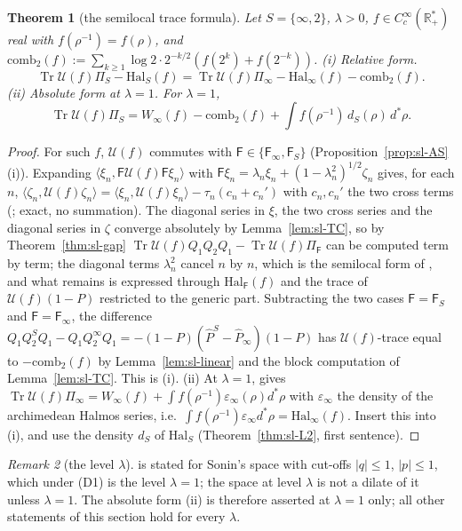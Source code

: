 \documentclass[11pt]{amsart}
\newtheorem{theorem}{Theorem}[section]
\theoremstyle{definition}
\theoremstyle{remark}
\newtheorem{remark}[theorem]{Remark}
\newcommand{\R}{\mathbb R}
\begin{document}
\begin{theorem}[the semilocal trace formula]\label{thm:sl-84}
Let $S=\{\infty,2\}$, $\lambda>0$, $f\in C_c^\infty(\R_+^*)$ real with $f(\rho^{-1})=f(\rho)$, and
$\mathrm{comb}_2(f):=\sum_{k\ge1}\log2\cdot2^{-k/2}(f(2^k)+f(2^{-k}))$.
\emph{(i) Relative form.}
\[
\operatorname{Tr}\mathcal U(f)\Pi_S-\mathrm{Hal}_S(f)=\operatorname{Tr}\mathcal U(f)\Pi_\infty-\mathrm{Hal}_\infty(f)-\mathrm{comb}_2(f).
\]
\emph{(ii) Absolute form at $\lambda=1$.} For $\lambda=1$,
\[
\operatorname{Tr}\mathcal U(f)\Pi_S=W_\infty(f)-\mathrm{comb}_2(f)+\int f(\rho^{-1})\,d_S(\rho)\,d^*\rho .
\]
\end{theorem}
\begin{proof}
For such $f$, $\mathcal U(f)$ commutes with $\mathsf F\in\{\mathsf F_\infty,\mathsf F_S\}$ (Proposition~\ref{prop:sl-AS}(i)). Expanding
$\langle\xi_n,\mathsf F\mathcal U(f)\mathsf F\xi_n\rangle$ with $\mathsf F\xi_n=\lambda_n\xi_n+(1-\lambda_n^2)^{1/2}\zeta_n$ gives, for each $n$,
$\langle\zeta_n,\mathcal U(f)\zeta_n\rangle=\langle\xi_n,\mathcal U(f)\xi_n\rangle-\tau_n(c_n+c_n')$ with $c_n,c_n'$ the two cross terms
(\cite[(87)]{ConnesConsani2021}; exact, no summation). The diagonal series in $\xi$, the two cross series and the
diagonal series in $\zeta$ converge absolutely by Lemma~\ref{lem:sl-TC}, so by Theorem~\ref{thm:sl-gap}
$\operatorname{Tr}\mathcal U(f)Q_1Q_2Q_1-\operatorname{Tr}\mathcal U(f)\Pi_{\mathsf F}$ can be computed term by term; the diagonal terms $\lambda_n^2$ cancel
$n$ by $n$, which is the semilocal form of \cite[(89)--(90)]{ConnesConsani2021}, and what remains is expressed through
$\mathrm{Hal}_{\mathsf F}(f)$ and the trace of $\mathcal U(f)(1-P)$ restricted to the generic part. Subtracting the two cases
$\mathsf F=\mathsf F_S$ and $\mathsf F=\mathsf F_\infty$, the difference $Q_1Q_2^SQ_1-Q_1Q_2^\infty Q_1=-(1-P)(\widehat P^S-\widehat P_\infty)(1-P)$
has $\mathcal U(f)$-trace equal to $-\mathrm{comb}_2(f)$ by Lemma~\ref{lem:sl-linear} and the block computation of
Lemma~\ref{lem:sl-TC}. This is (i). (ii) At $\lambda=1$, \cite[Thm.~4.7, (83)--(84)]{ConnesConsani2021} gives
$\operatorname{Tr}\mathcal U(f)\Pi_\infty=W_\infty(f)+\int f(\rho^{-1})\varepsilon_\infty(\rho)d^*\rho$ with $\varepsilon_\infty$ the density of the
archimedean Halmos series, i.e.\ $\int f(\rho^{-1})\varepsilon_\infty d^*\rho=\mathrm{Hal}_\infty(f)$. Insert this into (i), and use
the density $d_S$ of $\mathrm{Hal}_S$ (Theorem~\ref{thm:sl-L2}, first sentence).
\end{proof}

\begin{remark}[the level $\lambda$]\label{rem:sl-level}
\cite[Thm.~4.7]{ConnesConsani2021} is stated for Sonin's space with cut-offs $|q|\le1$, $|p|\le1$, which under (D1) is
the level $\lambda=1$; the space at level $\lambda$ is not a dilate of it unless $\lambda=1$. The absolute form (ii) is therefore
asserted at $\lambda=1$ only; all other statements of this section hold for every $\lambda$.
\end{remark}
\end{document}
